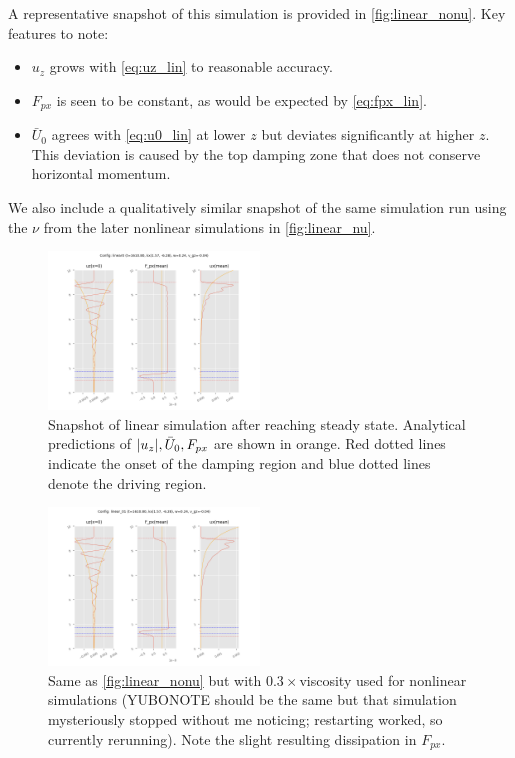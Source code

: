 \documentclass[twocolumn,
        nofootinbib,
        usenames, %
        dvipsnames %
    ]{revtex4-1}%
\DeclarePairedDelimiter\abs{\lvert}{\rvert}
\begin{document}
A representative snapshot of this simulation
is provided in \autoref{fig:linear_nonu}. Key features to note:
\begin{itemize}
    \item $u_z$ grows with \autoref{eq:uz_lin} to reasonable accuracy.

    \item $F_{px}$ is seen to be constant, as would be expected by
        \autoref{eq:fpx_lin}.

    \item $\bar{U}_0$ agrees with \autoref{eq:u0_lin} at lower $z$ but deviates
        significantly at higher $z$. This deviation is caused by the top damping
        zone that does not conserve horizontal momentum.
\end{itemize}
We also include a qualitatively similar snapshot of the same simulation run
using the $\nu$ from the later nonlinear simulations in \autoref{fig:linear_nu}.
\begin{figure}[h]
    \centering
    \includegraphics[width=0.5\textwidth]{plots/linear_nonu.png}
    \caption{Snapshot of linear simulation after reaching steady state.
        Analytical predictions of $\abs*{u_z}, \bar{U}_0, F_{px}$ are shown in
        orange. Red dotted lines indicate the onset of the damping region and
        blue dotted lines denote the driving region.}\label{fig:linear_nonu}
\end{figure}
\begin{figure}[h]
    \centering
    \includegraphics[width=0.5\textwidth]{plots/linear_nu.png}
    \caption{Same as \autoref{fig:linear_nonu} but with $0.3\times $viscosity
    used for nonlinear simulations (YUBONOTE should be the same but that
    simulation mysteriously stopped without me noticing; restarting worked, so
    currently rerunning). Note the slight resulting dissipation in $F_{px}$.
    }\label{fig:linear_nu}
\end{figure}
\end{document}
